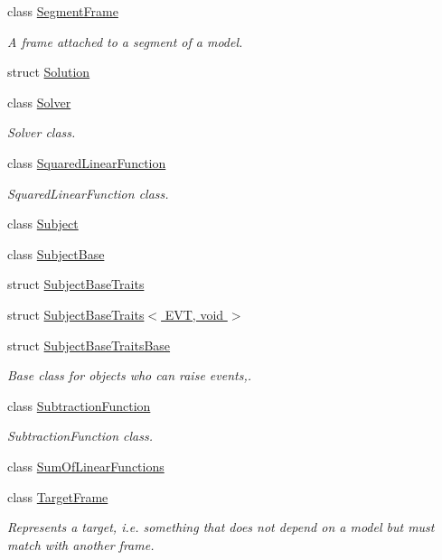 \begin{DoxyCompactItemize}
class \hyperlink{classocra_1_1SegmentFrame}{Segment\+Frame}
\begin{DoxyCompactList}\small\item\em A frame attached to a segment of a model. \end{DoxyCompactList}\item 
struct \hyperlink{structocra_1_1Solution}{Solution}
\item 
class \hyperlink{classocra_1_1Solver}{Solver}
\begin{DoxyCompactList}\small\item\em Solver class. \end{DoxyCompactList}\item 
class \hyperlink{classocra_1_1SquaredLinearFunction}{Squared\+Linear\+Function}
\begin{DoxyCompactList}\small\item\em Squared\+Linear\+Function class. \end{DoxyCompactList}\item 
class \hyperlink{classocra_1_1Subject}{Subject}
\item 
class \hyperlink{classocra_1_1SubjectBase}{Subject\+Base}
\item 
struct \hyperlink{structocra_1_1SubjectBaseTraits}{Subject\+Base\+Traits}
\item 
struct \hyperlink{structocra_1_1SubjectBaseTraits_3_01EVT_00_01void_01_4}{Subject\+Base\+Traits$<$ E\+V\+T, void $>$}
\item 
struct \hyperlink{structocra_1_1SubjectBaseTraitsBase}{Subject\+Base\+Traits\+Base}
\begin{DoxyCompactList}\small\item\em Base class for objects who can raise events,. \end{DoxyCompactList}\item 
class \hyperlink{classocra_1_1SubtractionFunction}{Subtraction\+Function}
\begin{DoxyCompactList}\small\item\em Subtraction\+Function class. \end{DoxyCompactList}\item 
class \hyperlink{classocra_1_1SumOfLinearFunctions}{Sum\+Of\+Linear\+Functions}
\item 
class \hyperlink{classocra_1_1TargetFrame}{Target\+Frame}
\begin{DoxyCompactList}\small\item\em Represents a \textquotesingle{}target\textquotesingle{}, i.\+e. something that does not depend on a model but must match with another frame. \end{DoxyCompactList}\item 

\end{DoxyCompactItemize}
